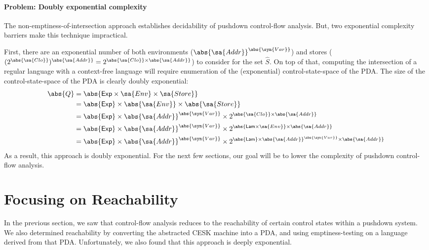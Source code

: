 \paragraph{Problem: Doubly exponential complexity}
\label{sec:doubly-exponential}
The non-emptiness-of-intersection approach establishes decidability of
pushdown control-flow analysis.
But, two exponential complexity barriers make this technique
impractical.


First, there are an exponential number of both environments
($\abs{\sa{Addr}}^{\abs{\syn{Var}}}$) and stores ($(2^{\abs{\sa{Clo}}})^{\abs{\sa{Addr}}} =
2^{\abs{\sa{Clo}} \times {\abs{\sa{Addr}}}}$) to consider for the set $\hat S$.
On top of that, computing the intersection of a regular language with
a context-free language will require enumeration of the
(exponential) control-state-space of the PDA.
The size of the control-state-space of the PDA is clearly doubly exponential:
\begin{align*}
 \abs{Q} 
 &= 
    \abs{\mathsf{Exp} \times \sa{Env} \times \sa{Store}}
 \\
 &= 
    \abs{\mathsf{Exp}} \times \abs{\sa{Env}} \times \abs{\sa{Store}}
 \\
 &=
    \abs{\mathsf{Exp}} 
    \times \abs{\sa{Addr}}^{\abs{\syn{Var}}}
    \times 2^{\abs{\sa{Clo}} \times {\abs{\sa{Addr}}}}
 \\   
 &=
    \abs{\mathsf{Exp}} 
    \times \abs{\sa{Addr}}^{\abs{\syn{Var}}}
    \times 2^{\abs{\mathsf{Lam} \times \sa{Env}} \times {\abs{\sa{Addr}}}}
 \\
 &=
    \abs{\mathsf{Exp}} 
    \times \abs{\sa{Addr}}^{\abs{\syn{Var}}}
    \times 2^{\abs{\mathsf{Lam}} \times \abs{\sa{Addr}}^{\abs{\syn{Var}}} \times {\abs{\sa{Addr}}}}
\end{align*}
As a result, this approach is doubly exponential.
For the next few sections, our goal will be to lower the complexity of
pushdown control-flow analysis.


\section{Focusing on Reachability}
\label{sec:pdreachability}

In the previous section, we saw that control-flow analysis reduces to
the reachability of certain control states within a pushdown system.
We also determined reachability by converting the
abstracted CESK machine into a PDA, and using emptiness-testing on a
language derived from that PDA.
Unfortunately, we also found that this approach is deeply exponential.

